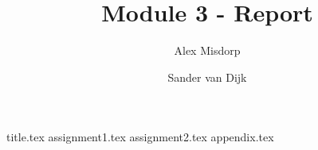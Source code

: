 \documentclass[final]{scrreprt} %
\title{Module 3 - Report}
\author{Alex {Misdorp} \and Sander {van Dijk}}
\begin{document}

{title.tex}
\newpage
{}
{assignment1.tex}
{assignment2.tex}
{appendix.tex}
\newpage
{}

\printbibliography
\end{document}
